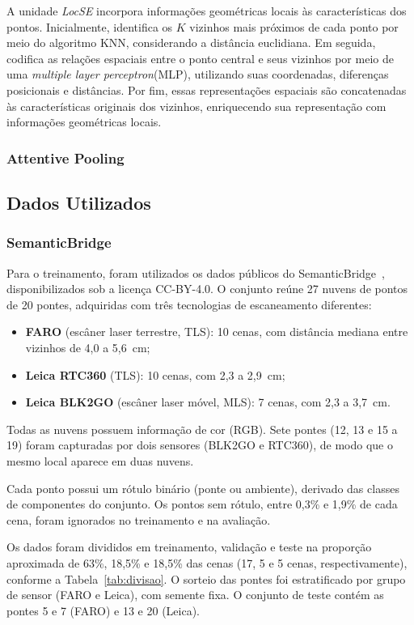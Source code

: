 \documentclass[conference]{IEEEtran}
\begin{document}
A unidade \textit{LocSE} incorpora informações geométricas locais às características dos pontos. Inicialmente, identifica os $K$ vizinhos mais próximos de cada ponto por meio do algoritmo KNN, considerando a distância euclidiana. Em seguida, codifica as relações espaciais entre o ponto central e seus vizinhos por meio de uma \textit{multiple layer perceptron}(MLP), utilizando suas coordenadas, diferenças posicionais e distâncias. Por fim, essas representações espaciais são concatenadas às características originais dos vizinhos, enriquecendo sua representação com informações geométricas locais.

\subsubsection{Attentive Pooling}
\subsection{Dados Utilizados}
\subsubsection{SemanticBridge}

Para o treinamento, foram utilizados os dados públicos do SemanticBridge~\cite{SemanticBridge}, disponibilizados sob a licença CC-BY-4.0. O conjunto reúne 27 nuvens de pontos de 20 pontes, adquiridas com três tecnologias de escaneamento diferentes:
\begin{itemize}
	\item \textbf{FARO} (escâner laser terrestre, TLS): 10 cenas, com distância mediana entre vizinhos de 4,0 a 5,6~cm;
	\item \textbf{Leica RTC360} (TLS): 10 cenas, com 2,3 a 2,9~cm;
	\item \textbf{Leica BLK2GO} (escâner laser móvel, MLS): 7 cenas, com 2,3 a 3,7~cm.
\end{itemize}
Todas as nuvens possuem informação de cor (RGB). Sete pontes (12, 13 e 15 a 19) foram capturadas por dois sensores (BLK2GO e RTC360), de modo que o mesmo local aparece em duas nuvens.

Cada ponto possui um rótulo binário (ponte ou ambiente), derivado das classes de componentes do conjunto. Os pontos sem rótulo, entre 0,3\% e 1,9\% de cada cena, foram ignorados no treinamento e na avaliação.

Os dados foram divididos em treinamento, validação e teste na proporção aproximada de 63\%, 18,5\% e 18,5\% das cenas (17, 5 e 5 cenas, respectivamente), conforme a Tabela~\ref{tab:divisao}. O sorteio das pontes foi estratificado por grupo de sensor (FARO e Leica), com semente fixa. O conjunto de teste contém as pontes 5 e 7 (FARO) e 13 e 20 (Leica).
\end{document}
